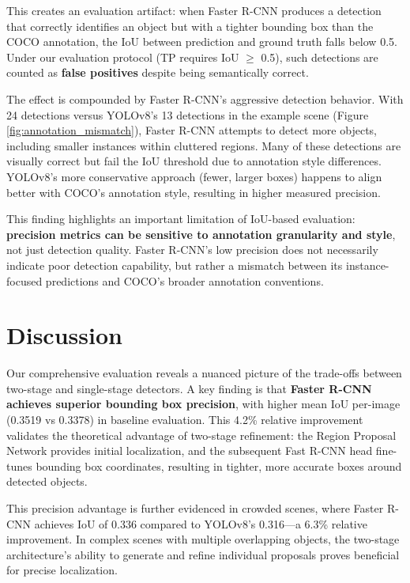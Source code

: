 \documentclass[conference]{IEEEtran}
\begin{document}
This creates an evaluation artifact: when Faster R-CNN produces a detection that correctly identifies an object but with a tighter bounding box than the COCO annotation, the IoU between prediction and ground truth falls below 0.5. Under our evaluation protocol (TP requires IoU $\geq$ 0.5), such detections are counted as \textbf{false positives} despite being semantically correct.

The effect is compounded by Faster R-CNN's aggressive detection behavior. With 24 detections versus YOLOv8's 13 detections in the example scene (Figure \ref{fig:annotation_mismatch}), Faster R-CNN attempts to detect more objects, including smaller instances within cluttered regions. Many of these detections are visually correct but fail the IoU threshold due to annotation style differences. YOLOv8's more conservative approach (fewer, larger boxes) happens to align better with COCO's annotation style, resulting in higher measured precision.

This finding highlights an important limitation of IoU-based evaluation: \textbf{precision metrics can be sensitive to annotation granularity and style}, not just detection quality. Faster R-CNN's low precision does not necessarily indicate poor detection capability, but rather a mismatch between its instance-focused predictions and COCO's broader annotation conventions.

\section{Discussion}

Our comprehensive evaluation reveals a nuanced picture of the trade-offs between two-stage and single-stage detectors. A key finding is that \textbf{Faster R-CNN achieves superior bounding box precision}, with higher mean IoU per-image (0.3519 vs 0.3378) in baseline evaluation. This 4.2\% relative improvement validates the theoretical advantage of two-stage refinement: the Region Proposal Network provides initial localization, and the subsequent Fast R-CNN head fine-tunes bounding box coordinates, resulting in tighter, more accurate boxes around detected objects.

This precision advantage is further evidenced in crowded scenes, where Faster R-CNN achieves IoU of 0.336 compared to YOLOv8's 0.316---a 6.3\% relative improvement. In complex scenes with multiple overlapping objects, the two-stage architecture's ability to generate and refine individual proposals proves beneficial for precise localization.
\end{document}
